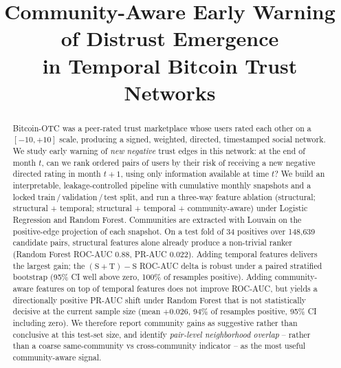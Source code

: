 \documentclass[conference]{IEEEtran}
\begin{document}
\title{Community-Aware Early Warning of Distrust Emergence \\
in Temporal Bitcoin Trust Networks}

\author{
}

\maketitle

\begin{abstract}
Bitcoin-OTC was a peer-rated trust marketplace whose users rated each
other on a $[-10, +10]$ scale, producing a signed, weighted, directed,
timestamped social network. We study early warning of \emph{new
negative} trust edges in this network: at the end of month $t$, can we
rank ordered pairs of users by their risk of receiving a new negative
directed rating in month $t+1$, using only information available at
time $t$? We build an interpretable, leakage-controlled pipeline with
cumulative monthly snapshots and a locked train\,/\,validation\,/\,test
split, and run a three-way feature ablation
(structural; structural + temporal;
structural + temporal + community-aware) under Logistic Regression and
Random Forest. Communities are extracted with Louvain on the
positive-edge projection of each snapshot. On a test fold of 34
positives over 148{,}639 candidate pairs, structural features alone
already produce a non-trivial ranker (Random Forest ROC-AUC $0.88$,
PR-AUC $0.022$). Adding temporal features delivers the largest gain;
the $(\mathrm{S}{+}\mathrm{T}) - \mathrm{S}$ ROC-AUC delta is robust
under a paired stratified bootstrap (95\% CI well above zero, 100\% of
resamples positive). Adding community-aware features on top of temporal features does not
improve ROC-AUC, but yields a directionally positive PR-AUC shift
under Random Forest that is not statistically decisive at the current
sample size (mean $+0.026$, 94\% of resamples positive, 95\% CI
including zero). We therefore report community gains as
suggestive rather than conclusive at this test-set size, and identify
\emph{pair-level neighborhood overlap} -- rather than a coarse
same-community vs cross-community indicator -- as the most useful
community-aware signal.
\end{abstract}
\end{document}
